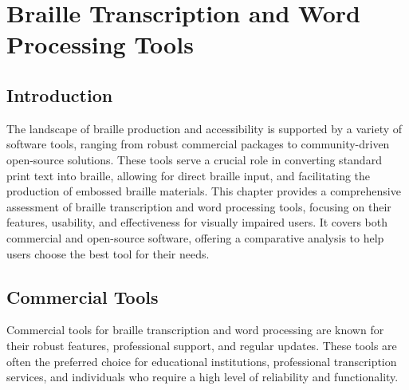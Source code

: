 \chapter{Braille Transcription and Word Processing Tools}\label{ch12:braille-transcription}


\section{Introduction}\label{ch12:sec:introduction}
The landscape of braille production and accessibility is supported by a variety of software tools, ranging from robust commercial packages to community-driven open-source solutions. These tools serve a crucial role in converting standard print text into braille, allowing for direct braille input, and facilitating the production of embossed braille materials. This chapter provides a comprehensive assessment of braille transcription and word processing tools, focusing on their features, usability, and effectiveness for visually impaired users. It covers both commercial and open-source software, offering a comparative analysis to help users choose the best tool for their needs.

\section{Commercial Tools}\label{ch12:sec:commercial-tools}
Commercial tools for braille transcription and word processing are known for their robust features, professional support, and regular updates. These tools are often the preferred choice for educational institutions, professional transcription services, and individuals who require a high level of reliability and functionality.

